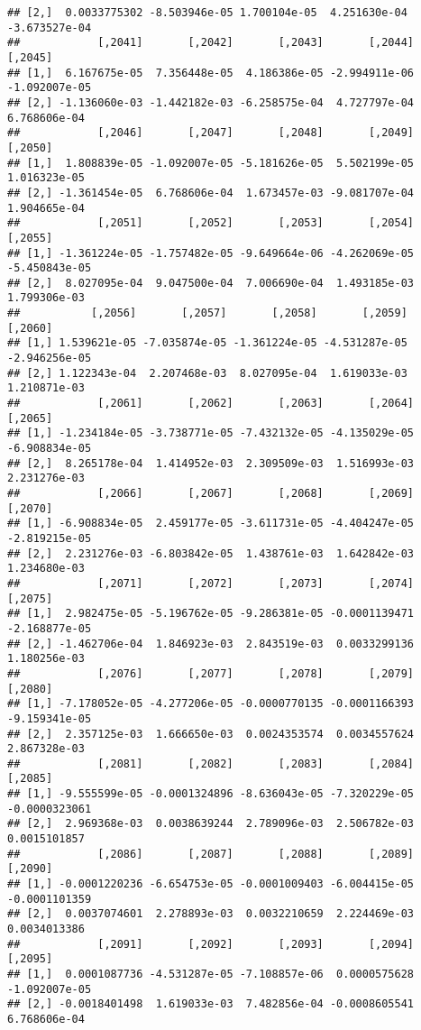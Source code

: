 \documentclass[
]{article}
\begin{document}
\begin{verbatim}
## [2,]  0.0033775302 -8.503946e-05 1.700104e-05  4.251630e-04 -3.673527e-04
##            [,2041]       [,2042]       [,2043]       [,2044]       [,2045]
## [1,]  6.167675e-05  7.356448e-05  4.186386e-05 -2.994911e-06 -1.092007e-05
## [2,] -1.136060e-03 -1.442182e-03 -6.258575e-04  4.727797e-04  6.768606e-04
##            [,2046]       [,2047]       [,2048]       [,2049]      [,2050]
## [1,]  1.808839e-05 -1.092007e-05 -5.181626e-05  5.502199e-05 1.016323e-05
## [2,] -1.361454e-05  6.768606e-04  1.673457e-03 -9.081707e-04 1.904665e-04
##            [,2051]       [,2052]       [,2053]       [,2054]       [,2055]
## [1,] -1.361224e-05 -1.757482e-05 -9.649664e-06 -4.262069e-05 -5.450843e-05
## [2,]  8.027095e-04  9.047500e-04  7.006690e-04  1.493185e-03  1.799306e-03
##           [,2056]       [,2057]       [,2058]       [,2059]       [,2060]
## [1,] 1.539621e-05 -7.035874e-05 -1.361224e-05 -4.531287e-05 -2.946256e-05
## [2,] 1.122343e-04  2.207468e-03  8.027095e-04  1.619033e-03  1.210871e-03
##            [,2061]       [,2062]       [,2063]       [,2064]       [,2065]
## [1,] -1.234184e-05 -3.738771e-05 -7.432132e-05 -4.135029e-05 -6.908834e-05
## [2,]  8.265178e-04  1.414952e-03  2.309509e-03  1.516993e-03  2.231276e-03
##            [,2066]       [,2067]       [,2068]       [,2069]       [,2070]
## [1,] -6.908834e-05  2.459177e-05 -3.611731e-05 -4.404247e-05 -2.819215e-05
## [2,]  2.231276e-03 -6.803842e-05  1.438761e-03  1.642842e-03  1.234680e-03
##            [,2071]       [,2072]       [,2073]       [,2074]       [,2075]
## [1,]  2.982475e-05 -5.196762e-05 -9.286381e-05 -0.0001139471 -2.168877e-05
## [2,] -1.462706e-04  1.846923e-03  2.843519e-03  0.0033299136  1.180256e-03
##            [,2076]       [,2077]       [,2078]       [,2079]       [,2080]
## [1,] -7.178052e-05 -4.277206e-05 -0.0000770135 -0.0001166393 -9.159341e-05
## [2,]  2.357125e-03  1.666650e-03  0.0024353574  0.0034557624  2.867328e-03
##            [,2081]       [,2082]       [,2083]       [,2084]       [,2085]
## [1,] -9.555599e-05 -0.0001324896 -8.636043e-05 -7.320229e-05 -0.0000323061
## [2,]  2.969368e-03  0.0038639244  2.789096e-03  2.506782e-03  0.0015101857
##            [,2086]       [,2087]       [,2088]       [,2089]       [,2090]
## [1,] -0.0001220236 -6.654753e-05 -0.0001009403 -6.004415e-05 -0.0001101359
## [2,]  0.0037074601  2.278893e-03  0.0032210659  2.224469e-03  0.0034013386
##            [,2091]       [,2092]       [,2093]       [,2094]       [,2095]
## [1,]  0.0001087736 -4.531287e-05 -7.108857e-06  0.0000575628 -1.092007e-05
## [2,] -0.0018401498  1.619033e-03  7.482856e-04 -0.0008605541  6.768606e-04

\end{verbatim}
\end{document}
